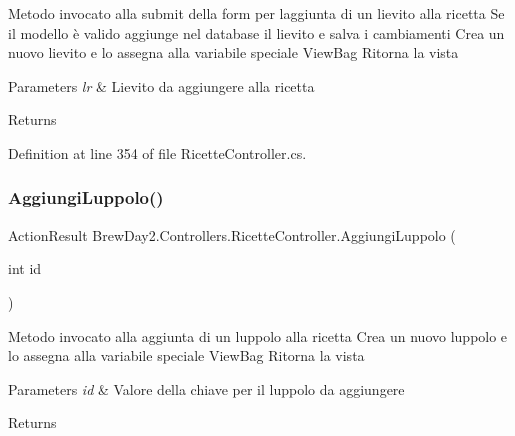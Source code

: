Metodo invocato alla submit della form per l\textquotesingle{}aggiunta di un lievito alla ricetta Se il modello è valido aggiunge nel database il lievito e salva i cambiamenti Crea un nuovo lievito e lo assegna alla variabile speciale View\+Bag Ritorna la vista 


\begin{DoxyParams}{Parameters}
{\em lr} & Lievito da aggiungere alla ricetta\\
\hline
\end{DoxyParams}
\begin{DoxyReturn}{Returns}

\end{DoxyReturn}


Definition at line 354 of file Ricette\+Controller.\+cs.

\mbox{\label{class_brew_day2_1_1_controllers_1_1_ricette_controller_af7fb082a690b79fbc2f4d23ee9bcf279}} 
\subsubsection{\texorpdfstring{Aggiungi\+Luppolo()}{AggiungiLuppolo()}\hspace{0.1cm}{\footnotesize\ttfamily [1/2]}}
{\footnotesize\ttfamily Action\+Result Brew\+Day2.\+Controllers.\+Ricette\+Controller.\+Aggiungi\+Luppolo (\begin{DoxyParamCaption}\item[{int}]{id }\end{DoxyParamCaption})}



Metodo invocato alla aggiunta di un luppolo alla ricetta Crea un nuovo luppolo e lo assegna alla variabile speciale View\+Bag Ritorna la vista 


\begin{DoxyParams}{Parameters}
{\em id} & Valore della chiave per il luppolo da aggiungere\\
\hline
\end{DoxyParams}
\begin{DoxyReturn}{Returns}

\end{DoxyReturn}


